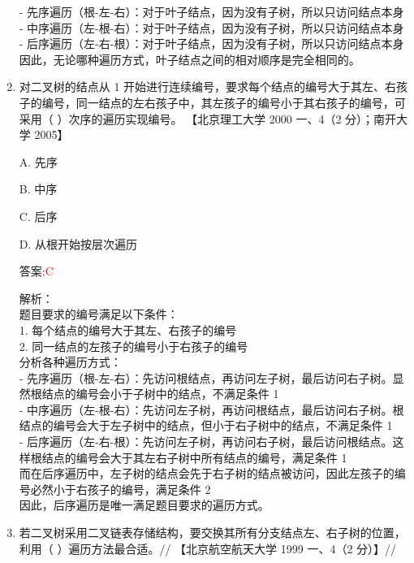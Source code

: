 \documentclass[lang=cn,newtx,10pt,scheme=chinese]{../../../elegantbook}
\begin{document}
\begin{enumerate}
    - 先序遍历（根-左-右）：对于叶子结点，因为没有子树，所以只访问结点本身\\
    - 中序遍历（左-根-右）：对于叶子结点，因为没有子树，所以只访问结点本身\\
    - 后序遍历（左-右-根）：对于叶子结点，因为没有子树，所以只访问结点本身\\
    
    因此，无论哪种遍历方式，叶子结点之间的相对顺序是完全相同的。

    \item 对二叉树的结点从 1 开始进行连续编号，要求每个结点的编号大于其左、右孩子的编号，同一结点的左右孩子中，其左孩子的编号小于其右孩子的编号，可采用（ ）次序的遍历实现编号。  
    【北京理工大学 2000 一、4（2 分）；南开大学 2005】  

    A. 先序  

    B. 中序  

    C. 后序  

    D. 从根开始按层次遍历  

    答案:\textcolor{red}{C}
    
    解析：\\
    题目要求的编号满足以下条件：\\
    1. 每个结点的编号大于其左、右孩子的编号\\
    2. 同一结点的左孩子的编号小于右孩子的编号\\
    
    分析各种遍历方式：\\
    - 先序遍历（根-左-右）：先访问根结点，再访问左子树，最后访问右子树。显然根结点的编号会小于子树中的结点，不满足条件 1\\
    - 中序遍历（左-根-右）：先访问左子树，再访问根结点，最后访问右子树。根结点的编号会大于左子树中的结点，但小于右子树中的结点，不满足条件 1\\
    - 后序遍历（左-右-根）：先访问左子树，再访问右子树，最后访问根结点。这样根结点的编号会大于其左右子树中所有结点的编号，满足条件 1\\
    
    而在后序遍历中，左子树的结点会先于右子树的结点被访问，因此左孩子的编号必然小于右孩子的编号，满足条件 2\\
    
    因此，后序遍历是唯一满足题目要求的遍历方式。

    \item 若二叉树采用二叉链表存储结构，要交换其所有分支结点左、右子树的位置，利用（ ）遍历方法最合适。//
        【北京航空航天大学 1999 一、4（2 分）】//


\end{enumerate}
\end{document}
